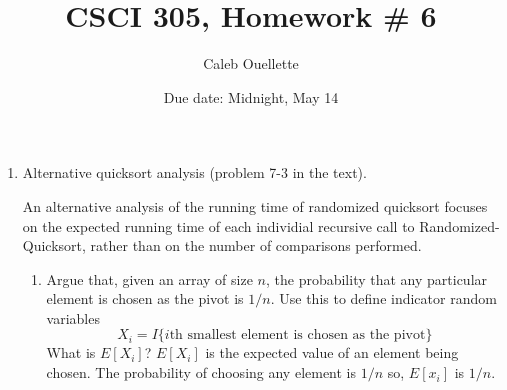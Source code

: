 \documentclass{article}
\title{CSCI 305, Homework \# 6}
\author{Caleb Ouellette}
\date{Due date:  Midnight, May 14}
\begin{document}
  
  \maketitle
  
  \begin{enumerate}
  \item Alternative quicksort analysis (problem 7-3 in the text).
  
    An alternative analysis of the running time of randomized quicksort
    focuses on the expected running time of each individial recursive
    call to {\sc Randomized-Quicksort}, rather than on the number of
    comparisons performed.
  
    \begin{enumerate}
      \item Argue that, given an array of size $n$, the probability that
        any particular element is chosen as the pivot is $1/n$.  Use
        this to define indicator random variables
        \[
        X_i = I\{\mbox{$i$th smallest element is chosen as the pivot}\}
        \]
        What is $E[X_i]$?
        $E[X_i]$ is the expected value of an element being chosen.
        The probability of choosing any element is $1/n$ so, $E[x_i]$ is $1/n$.


\end{enumerate}
\end{enumerate}
\end{document}
